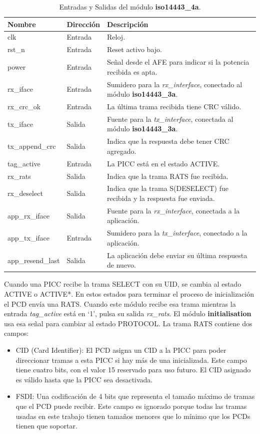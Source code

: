 \documentclass[a4paper, twoside, 11pt]{report}
\begin{document}
\begin{table}[htb]
  \centering
  \tablezebra
  \begin{tabulary}{\linewidth}{l|l|L}
    \setcounter{rownum}{0}
    \textbf{Nombre}&\textbf{Dirección}&\textbf{Descripción} \\
    \hline
    clk&Entrada&Reloj. \\
    rst\_n&Entrada&Reset activo bajo. \\
    power&Entrada&Señal desde el AFE para indicar si la potencia recibida es apta. \\
    rx\_iface&Entrada&Sumidero para la \textit{rx\_interface}, conectado al módulo \textbf{iso14443\_3a}. \\
    rx\_crc\_ok&Entrada&La última trama recibida tiene CRC válido. \\
    tx\_iface&Salida&Fuente para la \textit{tx\_interface}, conectada al módulo \textbf{iso14443\_3a}. \\
    tx\_append\_crc&Salida&Indica que la respuesta debe tener CRC agregado. \\
    tag\_active&Entrada&La PICC está en el estado ACTIVE. \\
    rx\_rats&Salida&Indica que la trama RATS fue recibida. \\
    rx\_deselect&Salida&Indica que la trama S(DESELECT) fue recibida y la respuesta fue enviada. \\
    app\_rx\_iface&Salida&Fuente para la \textit{rx\_interface}, conectada a la aplicación. \\
    app\_tx\_iface&Entrada&Sumidero para la \textit{tx\_interface}, conectado a la aplicación. \\
    app\_resend\_last&Salida&La aplicación debe enviar su última respuesta de nuevo. \\
  \end{tabulary}
  \caption{Entradas y Salidas del módulo \textbf{iso14443\_4a}.}
  \label{tab:ports_iso14443_4a}
\end{table}

Cuando una PICC recibe la trama SELECT con su UID, se cambia al estado ACTIVE o ACTIVE*. En estos estados para terminar el proceso de inicialización el PCD envía una RATS. Cuando este módulo recibe esa trama mientras la entrada \textit{tag\_active} está en ‘1’, pulsa su salida \textit{rx\_rats}. El módulo \textbf{initialisation} usa esa señal para cambiar al estado PROTOCOL. La trama RATS contiene dos campos:

\begin{itemize}
  \item CID (Card Identifier): El PCD asigna un CID a la PICC para poder direccionar tramas a esta PICC si hay más de una inicializada. Este campo tiene cuatro bits, con el valor 15 reservado para uso futuro. El CID asignado es válido hasta que la PICC sea desactivada.
  \item FSDI: Una codificación de 4 bits que representa el tamaño máximo de tramas que el PCD puede recibir. Este campo es ignorado porque todas las tramas usadas en este trabajo tienen tamaños menores que lo mínimo que los PCDs tienen que soportar.
\end{itemize}
\end{document}
